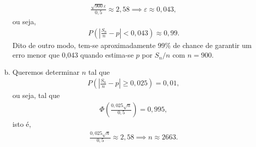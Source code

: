\documentclass[../Notas.tex]{subfiles}
\begin{document}
\begin{example}
\begin{enumerate}[(a)]
\begin{align*}
            \frac{\sqrt{900}\varepsilon}{0,5}\approx 2,58 \implies \varepsilon\approx 0,043,
        \end{align*}
        ou seja,
        \begin{align*}
            P\left( \left| \frac{S_n}{n} - p \right| < 0,043 \right) \approx 0,99.
        \end{align*}
        Dito de outro modo, tem-se aproximadamente 99\% de chance de garantir um erro menor que 0,043 quando estima-se $p$ por $S_n/n$ com $n=900$.
        \item Queremos determinar $n$ tal que
        \begin{align*}
            P\left( \left| \frac{S_n}{n} - p \right| \geq 0,025 \right) = 0,01,
        \end{align*}
        ou seja, tal que
        \begin{align*}
            \Phi\left( \frac{0,025\sqrt{n}}{0,5} \right) = 0,995,
        \end{align*}
        isto é,
        \begin{align*}
            \frac{0,025\sqrt{n}}{0,5} \approx 2,58 \implies n\approx 2663.
        \end{align*}
    \end{enumerate}
\end{example}
\end{document}
